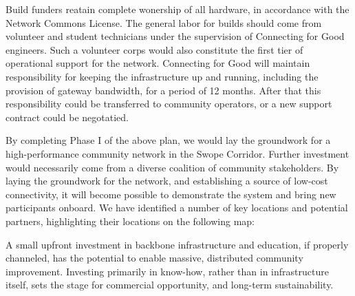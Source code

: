 Build funders reatain complete wonership of all hardware, in accordance with the Network Commons License. The general labor for builds should come from volunteer and student technicians under the supervision of Connecting for Good engineers. Such a volunteer corps would also constitute the first tier of operational support for the network. Connecting for Good will maintain responsibility for keeping the infrastructure up and running, including the provision of gateway bandwidth, for a period of 12 months. After that this responsibility could be transferred to community operators, or a new support contract could be negotatied. \par

By completing Phase I of the above plan, we would lay the groundwork for a high-performance community network in the Swope Corridor. Further investment would necessarily come from a diverse coalition of community stakeholders. By laying the groundwork for the network, and establishing a source of low-cost connectivity, it will become possible to demonstrate the system and bring new participants onboard. We have identified a number of key locations and potential partners, highlighting their locations on the following map: 

\begin{center}
\end{center}


A small upfront investment in backbone infrastructure and education, if properly
channeled, has the potential to enable massive, distributed community
improvement. Investing  primarily in know-how, rather than in infrastructure
itself, sets the stage for commercial opportunity, and long-term sustainability.
